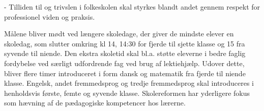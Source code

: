 -	Tilliden til og trivslen i folkeskolen skal styrkes blandt andet gennem respekt for professionel viden og praksis.

Målene bliver mødt ved længere skoledage, der giver de mindste elever en skoledag, som slutter omkring kl 14, 14:30 for fjerde til sjette klasse og 15 fra syvende til niende. Den ekstra skoletid skal bl.a. støtte eleverne i bedre faglig fordybelse ved særligt udfordrende fag ved brug af lektiehjælp. Udover dette, bliver flere timer introduceret i form dansk og matematik fra fjerde til niende klasse. Engelsk, andet fremmedsprog og tredje fremmedsprog skal introduceres i henholdsvis første, femte og syvende klasse. \cite{dennyefolkeskole}
Skolereformen har yderligere fokus som hævning af de pædagogiske kompetencer hos lærerne.

